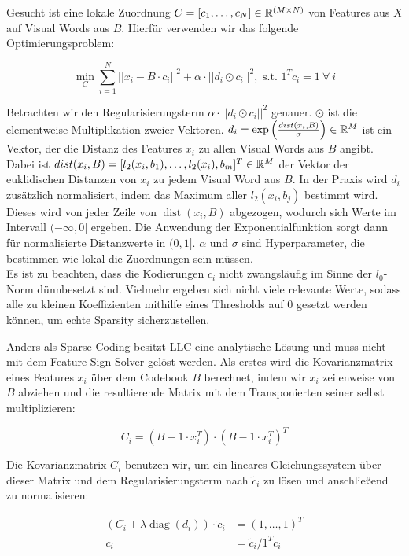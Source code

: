 Gesucht ist eine lokale Zuordnung $C = [c_1, \dots, c_N] \in \mathbb{R}^{(M \times N)}$ von Features aus $X$ auf Visual Words aus $B$. Hierfür verwenden wir das folgende Optimierungsproblem:

\begin{equation}
\min_C \sum_{i=1}^{N} ||x_i - B\cdot c_i||^2 + \alpha\cdot ||d_i \odot c_i||^2, \text{ s.t. } 1^Tc_i = 1 \: \forall \: i
\end{equation}

Betrachten wir den Regularisierungsterm $\alpha\cdot ||d_i \odot c_i||^2$ genauer. $\odot$ ist die elementweise Multiplikation zweier Vektoren. $d_i = \exp \left( \frac{ \mathop{dist}(x_i, B)}{\sigma} \right) \in \mathbb{R}^{M}$ ist ein Vektor, der die Distanz des Features $x_i$ zu allen Visual Words aus $B$ angibt. Dabei ist $\mathop{dist}(x_i, B) = [l_2(x_i, b_1), \dots, l_2(x_i), b_m]^T \in \mathbb{R}^M$ der Vektor der euklidischen Distanzen von $x_i$ zu jedem Visual Word aus $B$. In der Praxis wird $d_i$ zusätzlich normalisiert, indem das Maximum aller $l_2(x_i, b_j)$ bestimmt wird. Dieses wird von jeder Zeile von $\mathop{dist}(x_i, B)$ abgezogen, wodurch sich Werte im Intervall $(-\infty, 0]$ ergeben. Die Anwendung der Exponentialfunktion sorgt dann für normalisierte Distanzwerte in $(0, 1]$. $\alpha$ und $\sigma$ sind Hyperparameter, die bestimmen wie lokal die Zuordnungen sein müssen. \\
Es ist zu beachten, dass die Kodierungen $c_i$ nicht zwangsläufig im Sinne der $l_0$-Norm dünnbesetzt sind. Vielmehr ergeben sich nicht viele relevante Werte, sodass alle zu kleinen Koeffizienten mithilfe eines Thresholds auf 0 gesetzt werden können, um echte Sparsity sicherzustellen. 

Anders als Sparse Coding besitzt LLC eine analytische Lösung und muss nicht mit dem Feature Sign Solver gelöst werden. Als erstes wird die Kovarianzmatrix eines Features $x_i$ über dem Codebook $B$ berechnet, indem wir $x_i$ zeilenweise von $B$ abziehen und die resultierende Matrix mit dem Transponierten seiner selbst multiplizieren:

\begin{equation}
	C_i = (B - 1\cdot x_i^T)\cdot (B - 1\cdot x_i^T)^T
\end{equation}

Die Kovarianzmatrix $C_i$ benutzen wir, um ein lineares Gleichungssystem über dieser Matrix und dem Regularisierungsterm nach $\tilde{c}_i$ zu lösen und anschließend zu normalisieren:

\begin{align}
	(C_i + \lambda\mathop{diag}(d_i)) \cdot \tilde{c}_i &= (1, \dots, 1)^T \\
	c_i &= \tilde{c}_i / 1^T\tilde{c}_i
\end{align}

